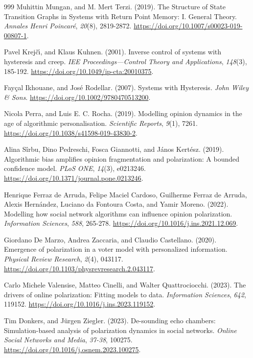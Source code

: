 \documentclass[10pt,a4paper]{article}
\begin{document}
\begin{thebibliography}{999}
Muhittin Mungan, and M. Mert Terzi. (2019). The Structure of State Transition Graphs in Systems with Return Point Memory: I. General Theory. \textit{Annales Henri Poincar\'{e}}, \textit{20}(8), 2819-2872. \url{https://doi.org/10.1007/s00023-019-00807-1}.

Pavel Krej\v{c}\'{\i}, and Klaus Kuhnen. (2001). Inverse control of systems with hysteresis and creep. \textit{IEE Proceedings---Control Theory and Applications}, \textit{148}(3), 185-192. \url{https://doi.org/10.1049/ip-cta:20010375}.

Fay\c{c}al Ikhouane, and Jos\'{e} Rodellar. (2007). Systems with Hysteresis. \textit{John Wiley \& Sons}. \url{https://doi.org/10.1002/9780470513200}.

Nicola Perra, and Luis E. C. Rocha. (2019). Modelling opinion dynamics in the age of algorithmic personalisation. \textit{Scientific Reports}, \textit{9}(1), 7261. \url{https://doi.org/10.1038/s41598-019-43830-2}.

Alina S\^{i}rbu, Dino Pedreschi, Fosca Giannotti, and J\'{a}nos Kert\'{e}sz. (2019). Algorithmic bias amplifies opinion fragmentation and polarization: A bounded confidence model. \textit{PLoS ONE}, \textit{14}(3), e0213246. \url{https://doi.org/10.1371/journal.pone.0213246}.

Henrique Ferraz de Arruda, Felipe Maciel Cardoso, Guilherme Ferraz de Arruda, Alexis Hern\'{a}ndez, Luciano da Fontoura Costa, and Yamir Moreno. (2022). Modelling how social network algorithms can influence opinion polarization. \textit{Information Sciences}, \textit{588}, 265-278. \url{https://doi.org/10.1016/j.ins.2021.12.069}.

Giordano De Marzo, Andrea Zaccaria, and Claudio Castellano. (2020). Emergence of polarization in a voter model with personalized information. \textit{Physical Review Research}, \textit{2}(4), 043117. \url{https://doi.org/10.1103/physrevresearch.2.043117}.

Carlo Michele Valensise, Matteo Cinelli, and Walter Quattrociocchi. (2023). The drivers of online polarization: Fitting models to data. \textit{Information Sciences}, \textit{642}, 119152. \url{https://doi.org/10.1016/j.ins.2023.119152}.

Tim Donkers, and J\"{u}rgen Ziegler. (2023). De-sounding echo chambers: Simulation-based analysis of polarization dynamics in social networks. \textit{Online Social Networks and Media}, \textit{37-38}, 100275. \url{https://doi.org/10.1016/j.osnem.2023.100275}.


\end{thebibliography}
\end{document}
